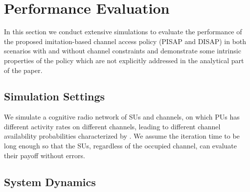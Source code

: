 \documentclass[12pt, onecolumn]{IEEEtran}
\theoremstyle{plain}
\theoremstyle{definition}
\begin{document}
\begin{comment}

\begin{algorithm}
\caption{Imitation-based Spectrum Access Policy under Channel Constraint: executed at each SU }
\begin{algorithmic}[1]
\STATE \textbf{Initialization:} set the imitation factor , the imitation threshold  and the learning rate 
\STATE Randomly choose a channel for the first two iterations 
\WHILE{for each iteration }
        \STATE With probability 
            \STATE \hspace{0.25cm} Perform imitation in PISAP or DISAP on the same channel
        \STATE With probability 
            \STATE \hspace{0.25cm} Switch to a random channel
        \STATE :
\ENDWHILE
\end{algorithmic}
\label{algo:generic_imitation}
\end{algorithm}

\end{comment}






 \section{Performance Evaluation}
 \label{sec:simu}
 In this section we conduct extensive simulations to evaluate the performance of the proposed imitation-based channel access policy (PISAP and DISAP) in both scenarios with and without channel constraints and demonstrate some intrinsic properties of the policy which are not explicitly addressed in the analytical part of the paper.

 \subsection{Simulation Settings}

 We simulate a cognitive radio network of  SUs and  channels, on which PUs has different activity rates on different channels, leading to different channel availability
probabilities characterized by . We assume the iteration time to be long enough so that the SUs, regardless of the occupied channel, can evaluate their payoff
without errors.





 \subsection{System Dynamics}
\end{document}
